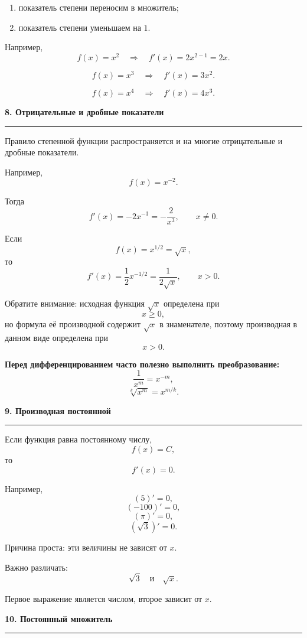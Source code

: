 \documentclass[a4paper,12pt]{article}
\newcommand{\lessonsection}[1]{%
    \vspace{0.5em}
    {\Large\bfseries\color{darkaccent}#1}\par
    \vspace{0.2em}
    {\color{accent}\rule{\linewidth}{0.6pt}}
    \vspace{0.5em}
}
\newcommand{\important}[1]{\textbf{\color{darkaccent}#1}}
\begin{document}
\begin{enumerate}[label=\arabic*)]
    \item показатель степени переносим в множитель;
    \item показатель степени уменьшаем на \(1\).
\end{enumerate}

Например,
\[
f(x)=x^2
\quad\Longrightarrow\quad
f'(x)=2x^{2-1}=2x.
\]

\[
f(x)=x^3
\quad\Longrightarrow\quad
f'(x)=3x^2.
\]

\[
f(x)=x^4
\quad\Longrightarrow\quad
f'(x)=4x^3.
\]


\lessonsection{8. Отрицательные и дробные показатели}

Правило степенной функции распространяется и на многие отрицательные и дробные показатели.

Например,
\[
f(x)=x^{-2}.
\]

Тогда
\[
f'(x)
=
-2x^{-3}
=
-\frac2{x^3},
\qquad x\ne0.
\]

Если
\[
f(x)=x^{1/2}=\sqrt{x},
\]
то
\[
f'(x)
=
\frac12x^{-1/2}
=
\frac{1}{2\sqrt{x}},
\qquad x>0.
\]

Обратите внимание: исходная функция \(\sqrt{x}\) определена при
\[
x\ge0,
\]
но формула её производной содержит \(\sqrt{x}\) в знаменателе, поэтому производная в данном виде определена при
\[
x>0.
\]

\important{Перед дифференцированием часто полезно выполнить преобразование:}
\[
\frac1{x^m}=x^{-m},
\]
\[
\sqrt[k]{x^m}=x^{m/k}.
\]


\lessonsection{9. Производная постоянной}

Если функция равна постоянному числу,
\[
f(x)=C,
\]
то
\[
\boxed{f'(x)=0}.
\]

Например,
\[
(5)'=0,
\]
\[
(-100)'=0,
\]
\[
(\pi)'=0,
\]
\[
(\sqrt3)'=0.
\]

Причина проста: эти величины не зависят от \(x\).

Важно различать:
\[
\sqrt3
\quad\text{и}\quad
\sqrt{x}.
\]

Первое выражение является числом, второе зависит от \(x\).


\lessonsection{10. Постоянный множитель}
\end{document}

